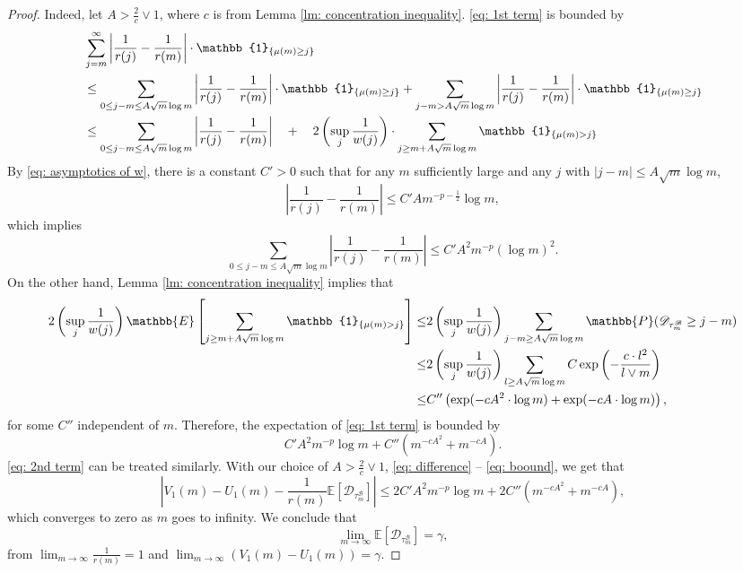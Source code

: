 \documentclass[EJP]{ejpecp} %
\newcommand{\abs}[1]{\left\vert #1 \right\vert}
\begin{document}
\begin{proof}
	Indeed, let $A> \frac{2}{c} \vee 1$, where $c$ is from Lemma \ref{lm: concentration inequality}. \eqref{eq: 1st term} is bounded by
	\begin{align*}
		& \sum_{j=m}^{\infty} \abs{\frac{1}{r(j)} -\frac{1}{r(m)} } \cdot \mathbb{1}_{\left\{\mu(m)\geq j \right\}}\\
		& \leq  \sum_{0\leq j-m \leq A \sqrt{m}\log m } \abs{\frac{1}{r(j)} -\frac{1}{r(m)} } \cdot \mathbb{1}_{\left\{\mu(m)\geq j \right\}}
		+  \sum_{j-m > A\sqrt{m}\log m } \abs{\frac{1}{r(j)} -\frac{1}{r(m)} } \cdot \mathbb{1}_{\left\{\mu(m)\geq j \right\}}
		\notag
		\\
		&\leq  \sum_{0\leq j-m \leq A\sqrt{m}\log m } \abs{\frac{1}{r(j)} -\frac{1}{r(m)} }
		\quad +\quad 2\left(\sup_j \frac{1}{w(j)}\right) \cdot \sum_{j\geq m + A\sqrt{m}\log m } \mathbb{1}_{\left\{ \mu(m) > j \right\}}
		\label{eq: low large difference}
	\end{align*}
	By \eqref{eq: asymptotics of w}, there is a constant $C'>0$ such that for any $m$ sufficiently large and any $j$ with $\abs{j-m}\leq A \sqrt m \log m $, 
	\[ \abs{\frac{1}{r(j)} -\frac{1}{r(m)} } \leq C' A m^{-p-\frac{1}{2}} \log m, \]
	which implies
	\[
	\sum_{0\leq j-m \leq A\sqrt{m}\log m } \abs{\frac{1}{r(j)} -\frac{1}{r(m)} } \le 
	C' A^2 m^{-p} (\log m)^2.
	\] On the other hand, Lemma \ref{lm: concentration inequality} implies that
	\begin{align*}
		2\left(\sup_j \frac{1}{w(j)}\right) \mathbb{E}\left[\sum_{j\geq m + A\sqrt{m}\log m } \mathbb{1}_{\left\{ \mu(m) > j \right\}} \right]
		\le & 2\left(\sup_j \frac{1}{w(j)}\right) \sum_{j-m \geq A \sqrt m \log m  } \mathbb{P}( \mathscr{D}_{\tau^{\mathscr{B}}_m} \geq j-m )  
		\notag 
		\\
		\leq& 2\left(\sup_j \frac{1}{w(j)}\right) \sum_{l \geq A \sqrt m \log m } C \exp\left( - \frac{c  \cdot l^2}{l \vee m}   \right)
		\notag\\
		\leq& C'' \left( \exp (- cA^2 \cdot \log m ) + \exp(-cA \cdot \log m) \right), 
	\end{align*} for some $C''$ independent of $m$. Therefore, the expectation of \eqref{eq: 1st term} is bounded by
	\begin{equation}\label{eq: boound}
		C' A^2 m^{-p} \log m + C''  \left( m ^{-cA^2} +  m^{-cA} \right). 
	\end{equation}
	\eqref{eq: 2nd term} can be treated similarly. With our choice of $A >\frac{2}{c} \vee 1$,
	\eqref{eq: difference} -- 
	\eqref{eq: boound}, we get that
	$$ \abs{ V_1(m)- U_1(m) -\frac{1}{r(m)}\mathbb{E}\left[ \mathscr{D}_{\tau^{\mathscr{B}}_m} \right] }
	\leq 2C' A^2 m^{-p} \log m + 2C''  \left( m ^{-cA^2} +  m^{-cA} \right), 
	$$ 
	which converges to zero as $m$ goes to infinity. We conclude that 
	\[
	\lim_{m\to\infty}\mathbb{E}\left[ \mathscr{D}_{\tau^{\mathscr{B}}_m} \right] = \gamma, 
	\] 
	from $\lim_{m\to\infty}\frac{1}{r(m)} =1$ and $ \lim_{m\to \infty} \left(V_1(m)-U_1(m) \right) = \gamma$.
\end{proof}
\end{document}
